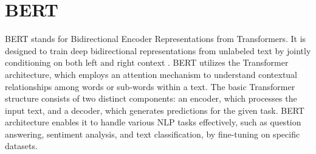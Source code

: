 \section{BERT}
    BERT stands for Bidirectional Encoder Representations from Transformers. It is designed to train deep bidirectional representations from unlabeled text by jointly conditioning on both left and right context \cite{devlin2019bert}. BERT utilizes the Transformer architecture, which employs an attention mechanism to understand contextual relationships among words or sub-words within a text. The basic Transformer structure consists of two distinct components: an encoder, which processes the input text, and a decoder, which generates predictions for the given task. BERT architecture enables it to handle various NLP tasks effectively, such as question answering, sentiment analysis, and text classification, by fine-tuning on specific datasets. 

    \begin{figure}[hbt!]
    \end{figure}
